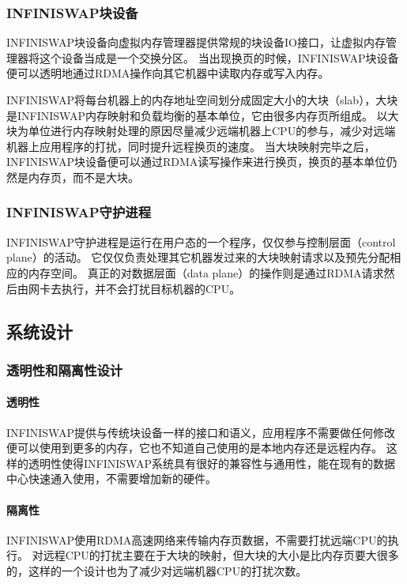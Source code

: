 \subsubsection{INFINISWAP块设备}
INFINISWAP块设备向虚拟内存管理器提供常规的块设备IO接口，让虚拟内存管理器将这个设备当成是一个交换分区。
当出现换页的时候，INFINISWAP块设备便可以透明地通过RDMA操作向其它机器中读取内存或写入内存。

INFINISWAP将每台机器上的内存地址空间划分成固定大小的大块（slab），大块是INFINISWAP内存映射和负载均衡的基本单位，它由很多内存页所组成。
以大块为单位进行内存映射处理的原因尽量减少远端机器上CPU的参与，减少对远端机器上应用程序的打扰，同时提升远程换页的速度。
当大块映射完毕之后，INFINISWAP块设备便可以通过RDMA读写操作来进行换页，换页的基本单位仍然是内存页，而不是大块。

\subsubsection{INFINISWAP守护进程}
INFINISWAP守护进程是运行在用户态的一个程序，仅仅参与控制层面（control plane）的活动。
它仅仅负责处理其它机器发过来的大块映射请求以及预先分配相应的内存空间。
真正的对数据层面（data plane）的操作则是通过RDMA请求然后由网卡去执行，并不会打扰目标机器的CPU。

\subsection{系统设计}

\subsubsection{透明性和隔离性设计}
\paragraph{透明性}
INFINISWAP提供与传统块设备一样的接口和语义，应用程序不需要做任何修改便可以使用到更多的内存，它也不知道自己使用的是本地内存还是远程内存。
这样的透明性使得INFINISWAP系统具有很好的兼容性与通用性，能在现有的数据中心快速通入使用，不需要增加新的硬件。

\paragraph{隔离性}
INFINISWAP使用RDMA高速网络来传输内存页数据，不需要打扰远端CPU的执行。
对远程CPU的打扰主要在于大块的映射，但大块的大小是比内存页要大很多的，这样的一个设计也为了减少对远端机器CPU的打扰次数。

